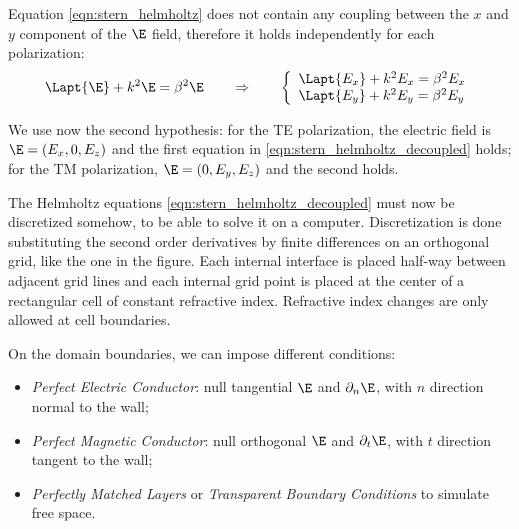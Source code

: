 Equation \eqref{eqn:stern_helmholtz} does not contain any coupling between
the $x$ and $y$ component of the $\E$ field, therefore it holds
independently for each polarization:
\begin{equation} \label{eqn:stern_helmholtz_decoupled}
\Lapt{\E} + k^2 \E = \beta^2 \E \qquad \Rightarrow \qquad
\left\{
\begin{array}{l}
  \Lapt{E_x} + k^2 E_x = \beta^2 E_x \\
  \Lapt{E_y} + k^2 E_y = \beta^2 E_y
\end{array}
\right.
\end{equation}

We use now the second hypothesis: for the TE polarization, the
electric field is $\E = (E_x,0,E_z)$ and the first equation in
\eqref{eqn:stern_helmholtz_decoupled} holds; for the TM polarization,
$\E = (0,E_y,E_z)$ and the second holds.

The Helmholtz equations \eqref{eqn:stern_helmholtz_decoupled} must now
be discretized somehow, to be able to solve it on a
computer. Discretization is done substituting the second order
derivatives by finite differences on an orthogonal grid, like the one
in the figure. Each internal interface is placed half-way between
adjacent grid lines and each internal grid point is placed at the
center of a rectangular cell of constant refractive index. Refractive
index changes are only allowed at cell boundaries.

On the domain boundaries, we can impose different conditions:
\begin{itemize}
\item
  \emph{Perfect Electric Conductor}: null tangential $\E$ and
  $\partial_n \E$, with $n$ direction normal to the wall;
\item
  \emph{Perfect Magnetic Conductor}: null orthogonal $\E$ and
  $\partial_t \E$, with $t$ direction tangent to the wall;
\item
  \emph{Perfectly Matched Layers} or \emph{Transparent Boundary
  Conditions} to simulate free space.
\end{itemize}

